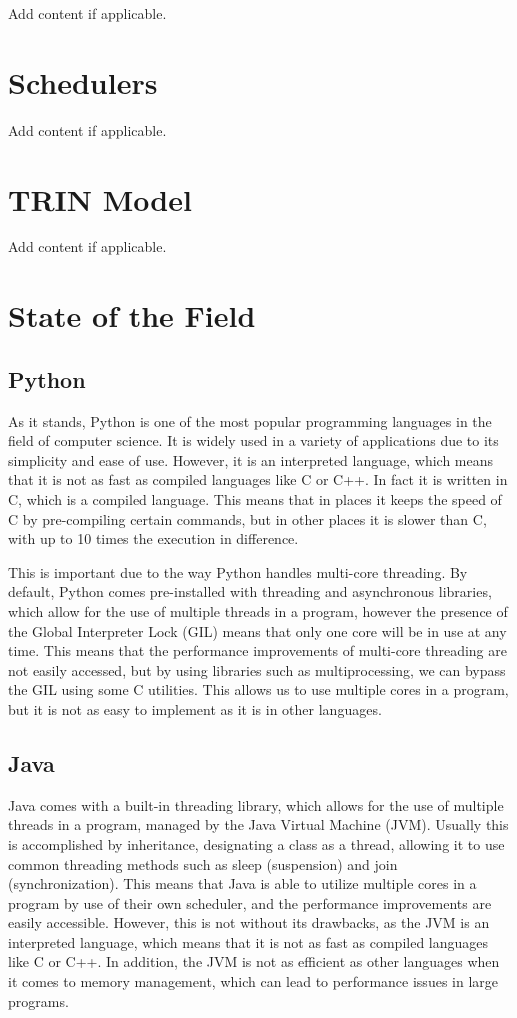 \documentclass{article}
\begin{document}
Add content if applicable.

\section{Schedulers}

Add content if applicable.

\section{TRIN Model}

Add content if applicable.

\section{State of the Field}
\subsection{Python}

As it stands, Python is one of the most popular programming languages in the field of computer science. It is widely used in a variety of applications due to its simplicity and ease of use. However, it is an interpreted language, which means that it is not as fast as compiled languages like C or C++. In fact it is written in C, which is a compiled language. This means that in places it keeps the speed of C by pre-compiling certain commands, but in other places it is slower than C, with up to 10 times the execution in difference.

This is important due to the way Python handles multi-core threading. By default, Python comes pre-installed with threading and asynchronous libraries, which allow for the use of multiple threads in a program, however the presence of the Global Interpreter Lock (GIL) means that only one core will be in use at any time. This means that the performance improvements of multi-core threading are not easily accessed, but by using libraries such as multiprocessing, we can bypass the GIL using some C utilities. This allows us to use multiple cores in a program, but it is not as easy to implement as it is in other languages.

\subsection{Java}

Java comes with a built-in threading library, which allows for the use of multiple threads in a program, managed by the Java Virtual Machine (JVM). Usually this is accomplished by inheritance, designating a class as a thread, allowing it to use common threading methods such as sleep (suspension) and join (synchronization). This means that Java is able to utilize multiple cores in a program by use of their own scheduler, and the performance improvements are easily accessible. However, this is not without its drawbacks, as the JVM is an interpreted language, which means that it is not as fast as compiled languages like C or C++. In addition, the JVM is not as efficient as other languages when it comes to memory management, which can lead to performance issues in large programs. 
\end{document}
